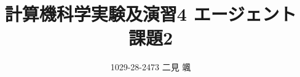 \documentclass{jsarticle}
\begin{document}
\title{計算機科学実験及演習4 エージェント 課題2}
\author{1029-28-2473 二見 颯}
\maketitle
\end{document}
